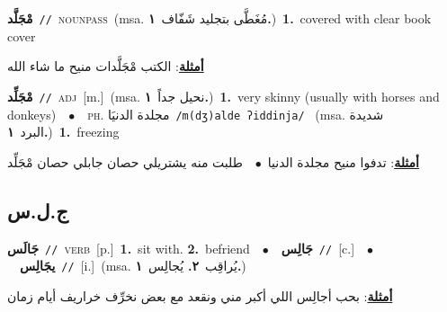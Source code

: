 \documentclass[10pt,a4paper,twoside]{article} %
\begin{document}
\begin{multicols}{2}
{\setlength\topsep{0pt}\textbf{\foreignlanguage{arabic}{مْجَلَّد}}\ {\color{gray}\texttt{//}\color{black}}\ \textsc{noun\textunderscore pass}\ \color{gray}(msa. \foreignlanguage{arabic}{مُغَطَّى بتجليد شَفّاف}~\foreignlanguage{arabic}{\textbf{١.}})\color{black}\ \textbf{1.}~covered with clear book cover\  \begin{flushright}\color{gray}\foreignlanguage{arabic}{\textbf{\underline{\foreignlanguage{arabic}{أمثلة}}}: الكتب مْجَلَّدات منيح ما شاء الله}\end{flushright}\color{black}} \vspace{2mm}

{\setlength\topsep{0pt}\textbf{\foreignlanguage{arabic}{مْجَلِّد}}\ {\color{gray}\texttt{//}\color{black}}\ \textsc{adj}\ [m.]\ \color{gray}(msa. \foreignlanguage{arabic}{نحيل جداً}~\foreignlanguage{arabic}{\textbf{١.}})\color{black}\ \textbf{1.}~very skinny (usually with horses and donkeys)\ \ $\bullet$\ \ \textsc{ph.} \color{gray} \foreignlanguage{arabic}{مجلدة الدنيَا}\color{black}\ {\color{gray}\texttt{/{\sffamily m(dʒ)alde ʔiddinja}/}\color{black}}\ \color{gray} (msa. \foreignlanguage{arabic}{شديدة البرد}~\foreignlanguage{arabic}{\textbf{١.}})\color{black}\ \textbf{1.}~freezing\  \begin{flushright}\color{gray}\foreignlanguage{arabic}{\textbf{\underline{\foreignlanguage{arabic}{أمثلة}}}: تدفوا منيح مجلدة الدنيا\ $\bullet$\ \  طلبت منه يشتريلي حصان جابلي حصان مْجَلِّد}\end{flushright}\color{black}} \vspace{2mm}

\vspace{-3mm}
\subsection*{\color{blue}\foreignlanguage{arabic}{ج.ل.س}\color{blue}{}} 

{\setlength\topsep{0pt}\textbf{\foreignlanguage{arabic}{جَالَس}}\ {\color{gray}\texttt{//}\color{black}}\ \textsc{verb}\ [p.]\ \textbf{1.}~sit with.  \textbf{2.}~befriend\ \ $\bullet$\ \ \setlength\topsep{0pt}\textbf{\foreignlanguage{arabic}{جَالِس}}\ {\color{gray}\texttt{//}\color{black}}\ [c.]\ \ $\bullet$\ \ \setlength\topsep{0pt}\textbf{\foreignlanguage{arabic}{يجَالِس}}\ {\color{gray}\texttt{//}\color{black}}\ [i.]\ \color{gray}(msa. \foreignlanguage{arabic}{يُراقِب}~\foreignlanguage{arabic}{\textbf{٢.}}  \foreignlanguage{arabic}{يُجالِس}~\foreignlanguage{arabic}{\textbf{١.}})\color{black}\  \begin{flushright}\color{gray}\foreignlanguage{arabic}{\textbf{\underline{\foreignlanguage{arabic}{أمثلة}}}: بحب أجالِس اللي أكبر مني ونقعد مع بعض نخرِّف خراريف أيام زمان}\end{flushright}\color{black}} \vspace{2mm}


\end{multicols}
\end{document}
